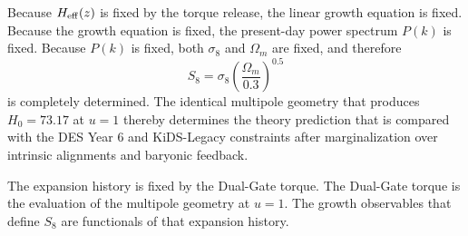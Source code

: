 Because \(H_{\rm eff}(z)\) is fixed by the torque release, the linear growth equation is fixed. Because the growth equation is fixed, the present-day power spectrum \(P(k)\) is fixed. Because \(P(k)\) is fixed, both \(\sigma_8\) and \(\Omega_m\) are fixed, and therefore
\[
S_8=\sigma_8\left(\frac{\Omega_m}{0.3}\right)^{0.5}
\]  
is completely determined. The identical multipole geometry that produces \(H_0=73.17\) at \(u=1\) thereby determines the theory prediction that is compared with the DES Year 6 and KiDS-Legacy constraints after marginalization over intrinsic alignments and baryonic feedback.

The expansion history is fixed by the Dual-Gate torque.  
The Dual-Gate torque is the evaluation of the multipole geometry at \(u=1\).  
The growth observables that define \(S_8\) are functionals of that expansion history.  
